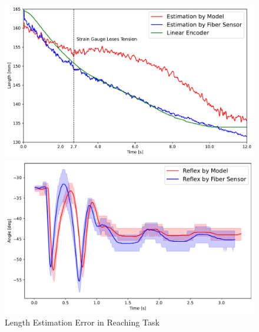 \begin{table}[H]
    \centering
    \caption{Parameters for Length Estimation} 
    \label{tab:PAM_reflex}
\end{table}

\begin{figure}[t]
    \centering
    \begin{minipage}[H]{\textwidth} 
        \begin{minipage}[H]{0.48\textwidth} 
            \centering
            \includegraphics[width=\columnwidth]{fig/reaching_error.pdf}
            \caption{Length Estimation Error in Reaching Task}
            \label{fig:reaching_error}
            \vspace{1em}
            \includegraphics[width=\columnwidth]{fig/time_vs_angle_model_sensor.pdf}

\end{minipage}
\end{minipage}
\end{figure}
